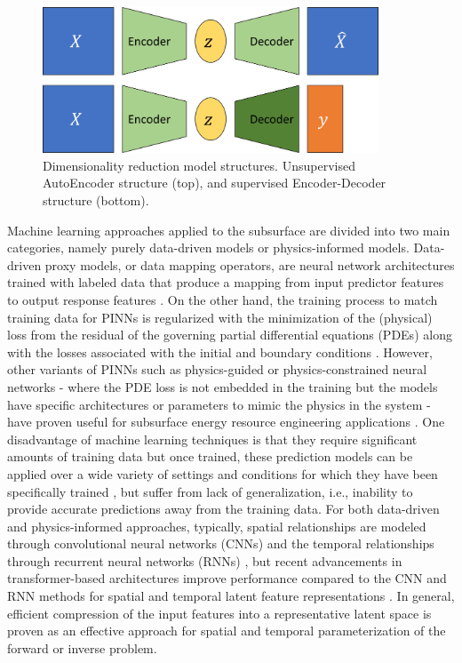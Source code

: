 \documentclass[10pt, twoside]{article}
\begin{document}
\begin{figure}
    \centering
    \includegraphics[width=10cm]{figures/latentAE.png}
    \caption{Dimensionality reduction model structures. Unsupervised AutoEncoder structure (top), and supervised Encoder-Decoder structure (bottom).}
    \label{latentAE}
\end{figure}

Machine learning approaches applied to the subsurface are divided into two main categories, namely purely data-driven models or physics-informed models. Data-driven proxy models, or data mapping operators, are neural network architectures trained with labeled data that produce a mapping from input predictor features to output response features \cite{Oladyshkin2013671, Bao2019}. On the other hand, the training process to match training data for PINNs is regularized with the minimization of the (physical) loss from the residual of the governing partial differential equations (PDEs) along with the losses associated with the initial and boundary conditions \cite{karniadakis2021physics, yang2018physicsinformed}. However, other variants of PINNs such as physics-guided or physics-constrained neural networks - where the PDE loss is not embedded in the training but the models have specific architectures or parameters to mimic the physics in the system - have proven useful for subsurface energy resource engineering applications \cite{Wang2021, Coutinho2021, Zhu_2019}. One disadvantage of machine learning techniques is that they require significant amounts of training data but once trained, these prediction models can be applied over a wide variety of settings and conditions for which they have been specifically trained \cite{Yegnanarayana2009ArtificialNetworks, heaton2018ian}, but suffer from lack of generalization, i.e., inability to provide accurate predictions away from the training data. For both data-driven and physics-informed approaches, typically, spatial relationships are modeled through convolutional neural networks (CNNs) \cite{liu20213d, Yang2022} and the temporal relationships through recurrent neural networks (RNNs) \cite{jiang2021data, Ning2022}, but recent advancements in transformer-based architectures improve performance compared to the CNN and RNN methods for spatial and temporal latent feature representations \cite{liu2021swin, 10.1190/geo2022-0150.1, maldonado4403939multi}. In general, efficient compression of the input features into a representative latent space is proven as an effective approach for spatial and temporal parameterization of the forward or inverse problem.
\end{document}
